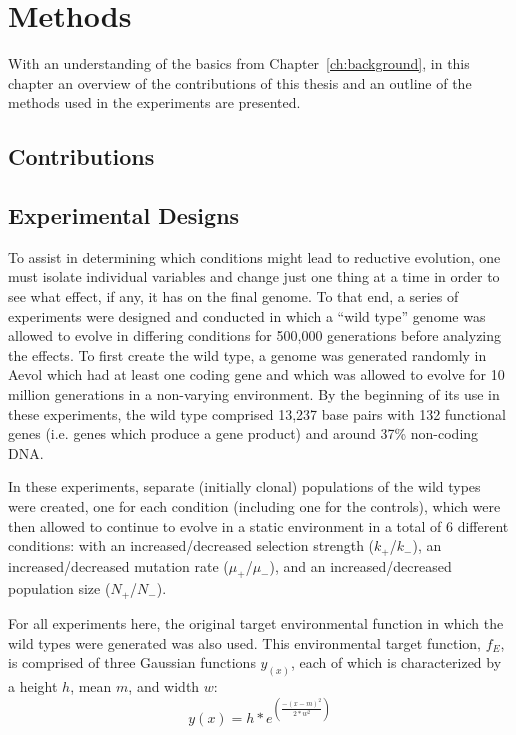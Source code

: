 \chapter{Methods}\label{ch:methods}
With an understanding of the basics from Chapter~\ref{ch:background}, in this chapter an overview of the contributions of this thesis and an outline of the methods used in the experiments are presented. 
\section{Contributions}

\section{Experimental Designs} \label{experimental_design}

To assist in determining which conditions might lead to reductive evolution, one must isolate individual variables and change just one thing at a time in order to see what effect, if any, it has on the final genome. To that end, a series of experiments were designed and conducted in which a ``wild type'' genome was allowed to evolve in differing conditions for 500,000 generations before analyzing the effects. To first create the wild type, a genome was generated randomly in Aevol which had at least one coding gene and which was allowed to evolve for 10 million generations in a non-varying environment. By the beginning of its use in these experiments, the wild type comprised 13,237 base pairs with 132 functional genes (i.e. genes which produce a gene product) and around 37\% non-coding DNA. 

In these experiments, separate (initially clonal) populations of the wild types were created, one for each condition (including one for the controls), which were then allowed to continue to evolve in a static environment in a total of 6 different conditions: with an increased/decreased selection strength ($k_+$/$k_-$), an increased/decreased mutation rate ($\mu_+$/$\mu_-$), and an increased/decreased population size ($N_+$/$N_-$). 

For all experiments here, the original target environmental function in which the wild types were generated was also used. This environmental target function, $f_E$, is comprised of three Gaussian functions $y_(x)$, each of which is characterized by a height $h$, mean $m$, and width $w$:
\begin{equation*}
y(x) = h * e^{\left(\frac{-(x-m)^2}{2 * w^2} \right)}
\end{equation*}

